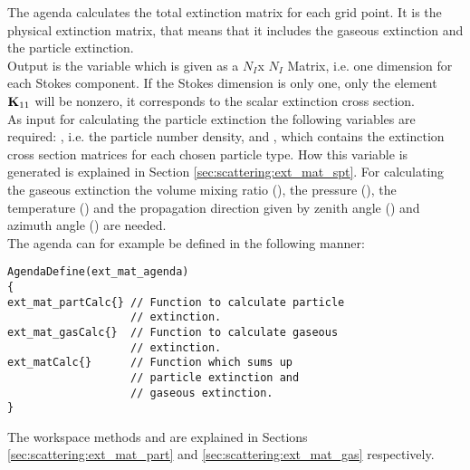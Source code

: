 The agenda  calculates the total extinction
matrix \ExtMat{}
for each grid point. It is the physical extinction matrix, that means
that it includes the gaseous extinction and the particle
extinction.\\
Output is the variable  which is given
as a $N_I$x $N_I$ Matrix, i.e. one dimension for each Stokes component. If the
Stokes dimension is only one, only the element ${\bf K}_{11}$ will be
nonzero, it corresponds to the scalar extinction cross section. \\
As input for calculating the particle extinction the following
variables are required:
, i.e. the particle number density, and 
, which contains the extinction cross section
matrices for each chosen particle type. How this variable is generated
is explained in Section \ref{sec:scattering:ext_mat_spt}. For calculating the
gaseous extinction the volume mixing ratio (), the
pressure (), the temperature  () and the
propagation direction given by zenith angle () and
azimuth angle () are needed.\\
The agenda can for example be defined in the following manner:

\begin{minipage}{0.9\hsize}
\begin{verbatim}
AgendaDefine(ext_mat_agenda)
{
ext_mat_partCalc{} // Function to calculate particle
                   // extinction.
ext_mat_gasCalc{}  // Function to calculate gaseous
                   // extinction. 
ext_matCalc{}      // Function which sums up
                   // particle extinction and 
                   // gaseous extinction.
}
\end{verbatim}
\end{minipage}

\vspace{2ex}
\noindent
The workspace methods  and
 are explained in Sections
\ref{sec:scattering:ext_mat_part} and \ref{sec:scattering:ext_mat_gas}
respectively.

\label{sec:scattering:ext_mat_part}

